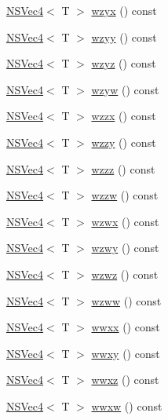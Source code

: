 \begin{DoxyCompactItemize}
\item 
\hyperlink{structNSVec4}{N\-S\-Vec4}$<$ T $>$ \hyperlink{structNSVec4_ae4986375b4229511d4737d7a183fcd56}{wzyx} () const 
\item 
\hyperlink{structNSVec4}{N\-S\-Vec4}$<$ T $>$ \hyperlink{structNSVec4_a7dd5b964769b9882e602ce5b0b845adc}{wzyy} () const 
\item 
\hyperlink{structNSVec4}{N\-S\-Vec4}$<$ T $>$ \hyperlink{structNSVec4_ada8dab6a2aee703da62e6fc184007005}{wzyz} () const 
\item 
\hyperlink{structNSVec4}{N\-S\-Vec4}$<$ T $>$ \hyperlink{structNSVec4_ab6582fa67266ba2855c722652197d832}{wzyw} () const 
\item 
\hyperlink{structNSVec4}{N\-S\-Vec4}$<$ T $>$ \hyperlink{structNSVec4_a315680fa4ae896259ef78fe00185f212}{wzzx} () const 
\item 
\hyperlink{structNSVec4}{N\-S\-Vec4}$<$ T $>$ \hyperlink{structNSVec4_ac5e827fa452353f74fb7992e12f92f93}{wzzy} () const 
\item 
\hyperlink{structNSVec4}{N\-S\-Vec4}$<$ T $>$ \hyperlink{structNSVec4_afa44758bea12ec0204031757c666e01a}{wzzz} () const 
\item 
\hyperlink{structNSVec4}{N\-S\-Vec4}$<$ T $>$ \hyperlink{structNSVec4_a5be6cf13e2b55fab6fa07b4da76f049f}{wzzw} () const 
\item 
\hyperlink{structNSVec4}{N\-S\-Vec4}$<$ T $>$ \hyperlink{structNSVec4_a2f468117c59aaaabe2bf6125ebb0f8b6}{wzwx} () const 
\item 
\hyperlink{structNSVec4}{N\-S\-Vec4}$<$ T $>$ \hyperlink{structNSVec4_a50ffe1b41f3eb1032872c3715972f548}{wzwy} () const 
\item 
\hyperlink{structNSVec4}{N\-S\-Vec4}$<$ T $>$ \hyperlink{structNSVec4_a154aeaf6dc51bb82bb821ddb77e7bed7}{wzwz} () const 
\item 
\hyperlink{structNSVec4}{N\-S\-Vec4}$<$ T $>$ \hyperlink{structNSVec4_ad0f7d8a3bd566b974215e3031e91c0d6}{wzww} () const 
\item 
\hyperlink{structNSVec4}{N\-S\-Vec4}$<$ T $>$ \hyperlink{structNSVec4_a1277431d7532e0685c51bccf5023a6d1}{wwxx} () const 
\item 
\hyperlink{structNSVec4}{N\-S\-Vec4}$<$ T $>$ \hyperlink{structNSVec4_ae5e8774c00054078dae00e04fe0d246a}{wwxy} () const 
\item 
\hyperlink{structNSVec4}{N\-S\-Vec4}$<$ T $>$ \hyperlink{structNSVec4_a5a856adc8970c7a648e0e539a570f5c1}{wwxz} () const 
\item 
\hyperlink{structNSVec4}{N\-S\-Vec4}$<$ T $>$ \hyperlink{structNSVec4_a3a2689a19897c4b9b7aaaa4de731bc50}{wwxw} () const 

\end{DoxyCompactItemize}
